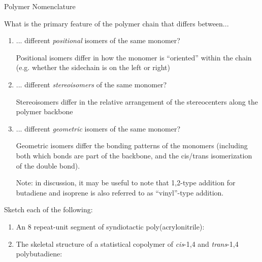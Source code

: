 \begin{activity}{Polymer Nomenclature}
\begin{ctqs}

	\question What is the primary feature of the polymer chain that differs between...
	
		\begin{enumerate}
			\item ... different \emph{positional} isomers of the same monomer?
			
				\begin{solution}[0.5in]
					Positional isomers differ in how the monomer is ``oriented'' within the chain (e.g. whether the sidechain is on the left or right)
				\end{solution}
			
			\item ... different \emph{stereoisomers} of the same monomer?
			
				\begin{solution}[0.5in]
					Stereoisomers differ in the relative arrangement of the stereocenters along the polymer backbone
				\end{solution}
			
			\item ... different \emph{geometric} isomers of the same monomer?
			
				\begin{solution}[0.5in]
					Geometric isomers differ the bonding patterns of the monomers (including both which bonds are part of the backbone, and the cis/trans isomerization of the double bond).
					
					Note: in discussion, it may be useful to note that 1,2-type addition for butadiene and isoprene is also referred to as ``vinyl''-type addition. 
				\end{solution}
			
		\end{enumerate}
		
	\question Sketch each of the following:
	
		\begin{enumerate}
			\item An 8 repeat-unit segment of syndiotactic poly(acrylonitrile):
			
				\begin{solution}[1in]
		\studentdisplay{
					~
		}\end{solution}
			
			\item The skeletal structure of a statistical copolymer of \emph{cis}-1,4 and \emph{trans}-1,4 polybutadiene:
			

\end{enumerate}
\end{ctqs}
\end{activity}

